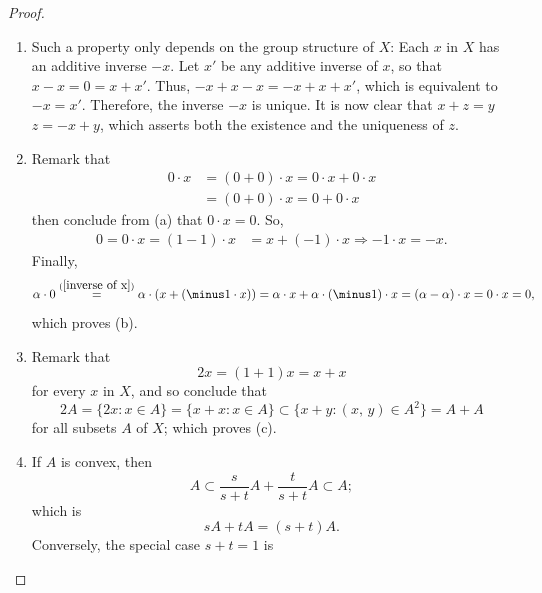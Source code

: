\begin{proof}\leavevmode
\begin{enumerate}[item-label=(\alph{enumi})]
\item Such a property only depends on the group structure of $X$: Each $x$ in
$X$ has an additive inverse $\minus x$. Let $x'$ be any additive inverse of $x$, so that
${x-x=0}=x+x'$. %
Thus, $\minus x +x -x =  \minus x + x + x' $, %
which is equivalent to $\minus x = x'$. Therefore, the inverse $\minus x$ is unique.
%
It is now clear that $x+z=y$ \IFF $z=\minus x +y$, %
which asserts both the existence and the uniqueness of $z$.
\item Remark that %
%
\begin{align}\label{1-1-b-0x}
  0\cdot x & =(0+0)\cdot x=0\cdot x+0\cdot x \\
           & =(0+0)\cdot x=0 +0\cdot x 
\end{align} 
%
then conclude from (a) that $0\cdot x=0$. So, %
\begin{align} \label{inverse of x}
  0=0\cdot x=(1-1)\cdot x &=x+(\minus 1)\cdot x
  \Rightarrow \minus 1\cdot x= \minus x.
\end{align}
%
Finally, %
%
\begin{equation}
  \alpha\cdot 0\overset{(\ref{inverse of x})}{=}
  \alpha\cdot (x+(\minus 1\cdot x))
  = \alpha \cdot x + \alpha \cdot (\minus 1) \cdot x 
  = (\alpha-\alpha )  \cdot x =0\cdot x = 0,
\end{equation}
%
which proves (b).
%
\item Remark that 
%
\begin{equation}
  2x =(1+1) x = x + x
\end{equation}
%
for every $x$ in $X$, and so conclude that %
%
\begin{equation}\label{double lies in sum}
  2A = \{2x: x\in A \} 
  = \{x + x: x \in A \} 
  \subset \{ x + y : (x,\,y) \in A^2 \} 
  = A+A
\end{equation}
%
for all subsets $A$ of $X$; which proves (c). %
\item If $A$ is convex, then %
%
\begin{equation}
  A \subset \frac{s}{s+t} A + \frac{t}{s+t} A \subset A;
\end{equation}
%
which is %
%
\begin{equation}\label{Exercise-1-d}
  sA + tA = (s+t)A.
\end{equation}
%
Conversely, the special case $s+t=1$ is %
%
\begin{equation}

\end{equation}
\end{enumerate}
\end{proof}
